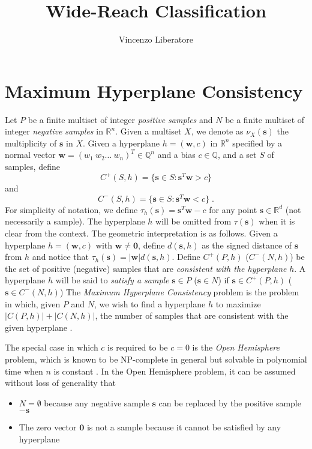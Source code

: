 \documentclass[11pt]{article}
\title{Wide-Reach Classification}
\author{Vincenzo Liberatore}
\theoremstyle{definition}
\newcommand{\R}{\mathbb{R}}
\newcommand{\Q}{\mathbb{Q}}
\newcommand{\vect}[1]{\mathbf{#1}}
\begin{document}
\maketitle

\section{Maximum Hyperplane Consistency}
\label{sec:mhc}
Let $P$ be a finite multiset of integer {\em positive samples\/} and 
$N$ be a finite multiset of integer {\em negative samples\/} in $\R^n$.
Given a multiset $X$, we denote as $\nu_X(\vect{s})$ the multiplicity of $\vect{s}$ in $X$. 
Given a hyperplane $h = (\vect{w}, c)$ in $\R^n$ 
specified by a normal vector $\vect{w} = (w_1 ~ w_2 \dots ~ w_n)^T \in \Q^n$ and a bias $c \in \Q$,
and a set $S$ of samples, define
$$C^+(S, h) = \{ \vect{s} \in S : \vect{s}^T \vect{w} > c \}$$
and 
$$C^-(S, h) = \{ \vect{s} \in S : \vect{s}^T \vect{w} < c \}\;.$$
For simplicity of notation, 
we define $\tau_{h}(\vect{s}) = \vect{s}^T \vect{w} - c$
for any point $\vect{s} \in \R^d$ (not necessarily a sample).
The hyperplane $h$ will be omitted from $\tau(\vect{s})$
when it is clear from the context.
The geometric interpretation is as follows. 
Given a hyperplane $h = (\vect{w}, c)$
with $\vect{w} \neq \vect{0}$,
define $d(\vect{s}, h)$ as the signed distance of $\vect{s}$ from $h$
and notice that $\tau_h(\vect{s}) = |\vect{w}| d(\vect{s}, h)$.
Define $C^+(P, h)$ ($C^-(N, h)$) be the set of positive 
(negative) samples that are 
{\em consistent with the hyperplane\/} $h$.
A hyperplane $h$ will be said to {\em satisfy a sample\/} 
$\vect{s} \in P$ ($\vect{s} \in N$)
if $\vect{s} \in C^+(P, h)$ ($\vect{s} \in C^-(N, h)$)
The {\em Maximum Hyperplane Consistency\/} problem is the problem in which,
given $P$ and $N$, we wish to find a hyperplane $h$
to maximize $|C(P, h)| + |C(N, h)|$, the number of samples 
that are consistent with the given hyperplane \cite{countingapprox}.

The special case in which $c$ is required to be $c = 0$ is the {\em Open Hemisphere\/} problem,
which is known to be NP-complete in general but solvable in polynomial time
when $n$ is constant \cite{densehemisphere}.
In the Open Hemisphere problem, it can be assumed without loss of generality that 
\begin{itemize} 
\item $N = \emptyset$ because 
any negative sample $\vect{s}$ can be replaced by the positive sample $-\vect{s}$
\item The zero vector $\vect{0}$ is not a sample because it cannot be satisfied by any hyperplane
\end{itemize}
\end{document}
